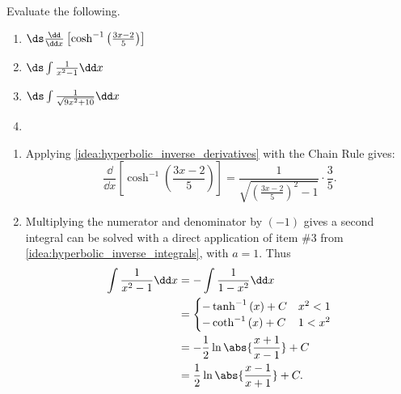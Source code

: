 \begin{example}\label{ex_hf3}%
Evaluate the following.
\begin{multicols}{2}
\begin{enumerate}
\item	$\ds \frac{\dd}{\dd x}\left[\cosh^{-1}\left(\frac{3x-2}{5}\right)\right]$
\item	$\ds \int\frac{1}{x^2-1}\dd x$
\item	$\ds \int \frac{1}{\sqrt{9x^2+10}}\dd x$
\item[]
\end{enumerate}
\end{multicols}
\solution
\begin{enumerate}
\item	Applying \autoref{idea:hyperbolic_inverse_derivatives} with the Chain Rule gives:
		\[\frac{\dd}{\dd x}\left[\cosh^{-1}\left(\frac{3x-2}5\right)\right] = \frac{1}{\sqrt{\left(\frac{3x-2}5\right)^2-1}}\cdot\frac35.\]

\item		Multiplying the numerator and denominator by $(-1)$ gives 
a %
second integral can be solved with a direct application of item \#3 from \autoref{idea:hyperbolic_inverse_integrals}, with $a=1$. Thus
\begin{align}
\int \frac{1}{x^2-1}\dd x &= -\int \frac{1}{1-x^2}\dd x \notag \\
		&= \begin{cases}-\tanh^{-1}\left(x\right)+C & x^2<1 \\
-\coth^{-1}\left(x\right)+C & 1<x^2 \end{cases} \notag\\
     &=-\frac12\ln\abs{\frac{x+1}{x-1}}+C\notag\\
     &=\frac12\ln\abs{\frac{x-1}{x+1}}+C.\label{eq:hf3}
     \end{align}



\end{enumerate}
\end{example}
